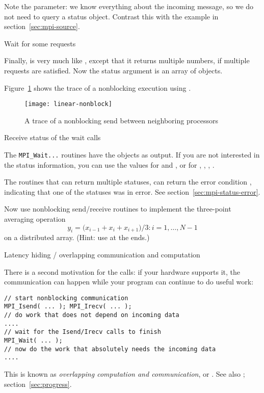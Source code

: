 Note the  parameter: we know everything
about the incoming message, so we do not need to query a status object.
Contrast this with the example in section~\ref{sec:mpi-source}.

 {Wait for some requests}

Finally,  is very much like ,
except that it returns multiple numbers, if multiple requests are
satisfied. Now the status argument is an array of 
objects.

Figure~\ref{fig:jump-nonblock} shows the trace of a nonblocking execution
using .
\begin{figure}[ht]
\texttt{[image: linear-nonblock]}
\caption{A trace of a nonblocking send between neighboring processors}
\label{fig:jump-nonblock}
\end{figure}

 {Receive status of the wait calls}
\label{sec:mpi-wait-status}

The \lstinline{MPI_Wait...} routines have the 
objects as output.
If you are not interested in
the status information, you can use the values
 for  and
,
or 
for , ,
, .

\begin{remark}
  The routines that can return multiple statuses,
  can return the error condition ,
  indicating that one of the statuses was in error.
  See section~\ref{sec:mpi-status-error}.
\end{remark}

\begin{exercise}
  \label{ex:3ptnonblock}
  Now use nonblocking send/receive routines to implement
  the three-point averaging operation
  \[ y_i=\bigl( x_{i-1}+x_i+x_{i+1} \bigr)/3\colon i=1,\ldots,N-1 \]
  on a distributed array. (Hint: use  at the ends.)
\end{exercise}

 {Latency hiding / overlapping communication and computation}

There is a second motivation for the  calls:
if your hardware supports it, the communication can
happen
while your program can continue to do useful work:
\begin{lstlisting}
// start nonblocking communication
MPI_Isend( ... ); MPI_Irecv( ... );
// do work that does not depend on incoming data
....
// wait for the Isend/Irecv calls to finish
MPI_Wait( ... );
// now do the work that absolutely needs the incoming data
....
\end{lstlisting}
This is known as \emph{overlapping computation and communication}, or
%
.
See also ; section~\ref{sec:progress}.


